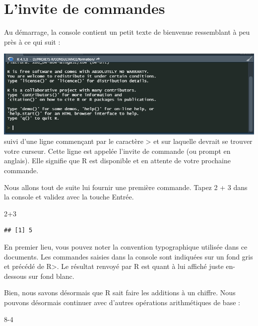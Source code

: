 \documentclass[
]{book}
\newenvironment{Shaded}{\begin{snugshade}}{\end{snugshade}}
\newcommand{\DecValTok}[1]{\textcolor[rgb]{0.00,0.00,0.81}{#1}}
\newcommand{\SpecialCharTok}[1]{\textcolor[rgb]{0.00,0.00,0.00}{#1}}
\begin{document}
\hypertarget{linvite-de-commandes}{%
\section{L'invite de commandes}\label{linvite-de-commandes}}

Au démarrage, la console contient un petit texte de bienvenue ressemblant à peu près à ce qui suit :

\includegraphics[width=1\linewidth]{images/console}
suivi d'une ligne commençant par le caractère \textgreater{} et sur laquelle devrait se trouver votre curseur. Cette ligne est appelée l'invite de commande (ou prompt en anglais). Elle signifie que R est disponible et en attente de votre prochaine commande.

Nous allons tout de suite lui fournir une première commande. Tapez 2 + 3 dans la console et validez avec la touche Entrée.

\begin{Shaded}
\begin{Highlighting}[]
\DecValTok{2}\SpecialCharTok{+}\DecValTok{3}
\end{Highlighting}
\end{Shaded}

\begin{verbatim}
## [1] 5
\end{verbatim}

En premier lieu, vous pouvez noter la convention typographique utilisée dans ce documents. Les commandes saisies dans la console sont indiquées sur un fond gris et précédé de R\textgreater. Le résultat renvoyé par R est quant à lui affiché juste en-dessous sur fond blanc.

Bien, nous savons désormais que R sait faire les additions à un chiffre. Nous pouvons désormais continuer avec d'autres opérations arithmétiques de base :

\begin{Shaded}
\begin{Highlighting}[]
\DecValTok{8{-}4}
\end{Highlighting}
\end{Shaded}
\end{document}
